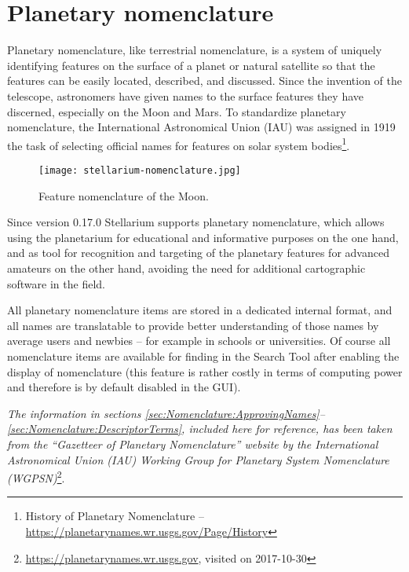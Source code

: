 
\chapter{Planetary nomenclature}
\label{ch:Nomenclature}

Planetary nomenclature, like terrestrial nomenclature, 
is a system of uniquely identifying features on the surface of a planet or 
natural satellite so that the features can be easily located, described, and discussed. 
Since the invention of the telescope, astronomers have given names to the surface 
features they have discerned, especially on the Moon and Mars. To standardize planetary 
nomenclature, the International Astronomical Union (IAU) was assigned in 1919 the task 
of selecting official names for features on solar system bodies\footnote{History of 
Planetary Nomenclature -- \url{https://planetarynames.wr.usgs.gov/Page/History}}.

\begin{figure}[ht]
\centering\texttt{[image: stellarium-nomenclature.jpg]}
\caption{Feature nomenclature of the Moon.}
\label{fig:Nomenclature:Moon}
\end{figure}

Since version 0.17.0 Stellarium supports planetary nomenclature, which allows using the 
planetarium for educational and informative purposes on the one hand, and as tool for 
recognition and targeting of the planetary features for advanced amateurs on the other 
hand, avoiding the need for additional cartographic software in the field. 

All planetary nomenclature items are stored in a dedicated internal format, 
and all names are translatable to provide better understanding of those names 
by average users and newbies -- for example in schools or universities.  
Of course all nomenclature items are available for finding in the Search Tool 
after enabling the display of nomenclature (this feature is rather costly in terms of 
computing power and therefore is by default disabled in the GUI).

\emph{The information in sections \ref{sec:Nomenclature:ApprovingNames}--\ref{sec:Nomenclature:DescriptorTerms}, 
included here for reference, has been taken from the ``Gazetteer of Planetary Nomenclature'' website 
by the International Astronomical Union (IAU) Working Group for Planetary System Nomenclature 
(WGPSN)}\footnote{\url{https://planetarynames.wr.usgs.gov}, visited on 2017-10-30}.

